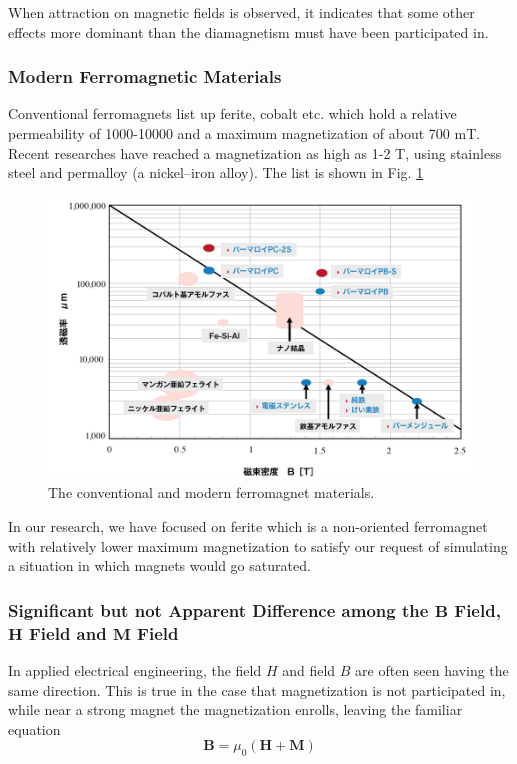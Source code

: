 When attraction on magnetic fields is observed,
it indicates that some other effects more dominant than the diamagnetism must have been participated in.


\newpage
\subsubsection{Modern Ferromagnetic Materials}
Conventional ferromagnets list up ferite, cobalt etc. which hold a relative permeability of 1000-10000 and a maximum magnetization of about 700 mT.
Recent researches have reached a magnetization as high as 1-2 T, using stainless steel and permalloy (a nickel–iron alloy).
The list is shown in Fig. \ref{fig:magnetMaterials}
\begin{figure}[H]
  \includegraphics[width=18cm, bb=9 9 900 600]{./section2Proposal/magnetMaterials.png}
  \caption{The conventional and modern ferromagnet materials.}
  \label{fig:magnetMaterials}
\end{figure}
In our research, we have focused on ferite which is a non-oriented ferromagnet with relatively lower maximum magnetization to satisfy our request of simulating a situation in which magnets would go saturated.


\newpage
\subsubsection{Significant but not Apparent Difference among the ${\bm B}$ Field, ${\bm H}$ Field and ${\bm M}$ Field}
In applied electrical engineering, the field $H$ and field $B$ are often seen having the same direction.
This is true in the case that magnetization is not participated in,
while near a strong magnet the magnetization enrolls,
leaving the familiar equation
\begin{equation}
  \mathbf{B} = \mu_0\left( \mathbf{H} + \mathbf{M} \right)\nonumber
\end{equation}

